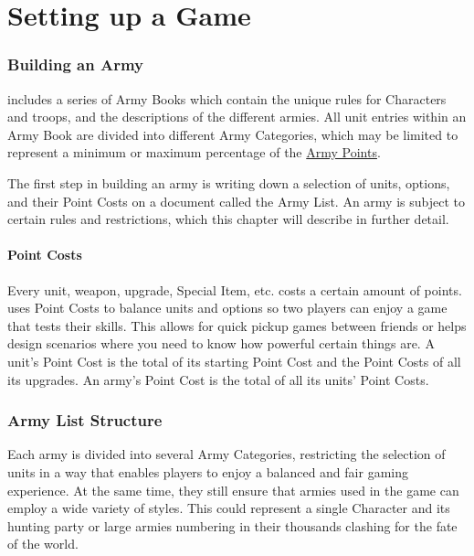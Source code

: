 
\part{Setting up a Game}
\label{setting_up_a_game}

\RBbmc

\section{Building an Army}
\label{building_an_army}

\nameofthegame{} includes a series of Army Books which contain the unique rules for Characters and troops, and the descriptions of the different armies. All unit entries within an Army Book are divided into different Army Categories, which may be limited to represent a minimum or maximum percentage of the \hyperref[army_points]{Army Points}.

The first step in building an army is writing down a selection of units, options, and their Point Costs on a document called the Army List. An army is subject to certain rules and restrictions, which this chapter will describe in further detail.

\subsection{Point Costs}
\label{point_costs}

Every unit, weapon, upgrade, Special Item, etc. costs a certain amount of points. \theninthage{} uses Point Costs to balance units and options so two players can enjoy a game that tests their skills. This allows for quick pickup games between friends or helps design scenarios where you need to know how powerful certain things are. A unit's Point Cost is the total of its starting Point Cost and the Point Costs of all its upgrades. An army's Point Cost is the total of all its units' Point Costs.

\section{Army List Structure}
\label{army_list_structure}

Each army is divided into several Army Categories, restricting the selection of units in a way that enables players to enjoy a balanced and fair gaming experience. At the same time, they still ensure that armies used in the game can employ a wide variety of styles. This could represent a single Character and its hunting party or large armies numbering in their thousands clashing for the fate of the world.

